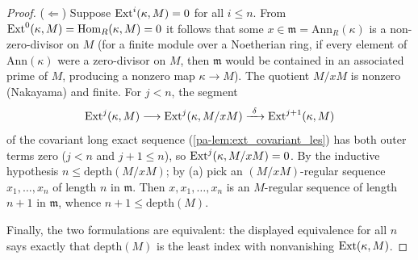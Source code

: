\begin{proof}
  (\(\Leftarrow\)) Suppose \(\operatorname{Ext}^i(\kappa, M) = 0\) for all \(i \leq n\). From
  \(\operatorname{Ext}^0(\kappa, M) = \operatorname{Hom}_R(\kappa, M) = 0\) it follows that some
  \(x \in \mathfrak m = \mathrm{Ann}_R(\kappa)\) is a non-zero-divisor on \(M\) (for a
  finite module over a Noetherian ring, if every element of \(\mathrm{Ann}(\kappa)\)
  were a zero-divisor on \(M\), then \(\mathfrak m\) would be contained in an associated
  prime of \(M\), producing a nonzero map \(\kappa \to M\)). The quotient \(M/xM\) is
  nonzero (Nakayama) and finite. For \(j < n\), the segment
  \[
    \operatorname{Ext}^{j}(\kappa, M) \longrightarrow \operatorname{Ext}^{j}(\kappa, M/xM)
      \xrightarrow{\ \delta\ } \operatorname{Ext}^{j+1}(\kappa, M)
  \]
  of the covariant long exact sequence (\ref{pa-lem:ext_covariant_les}) has both outer
  terms zero (\(j < n\) and \(j + 1 \leq n\)), so \(\operatorname{Ext}^{j}(\kappa, M/xM) = 0\). By the
  inductive hypothesis \(n \leq \mathrm{depth}(M/xM)\); by (a) pick an
  \((M/xM)\)-regular sequence \(x_1, \dots, x_n\) of length \(n\) in \(\mathfrak m\).
  Then \(x, x_1, \dots, x_n\) is an \(M\)-regular sequence of length \(n+1\) in
  \(\mathfrak m\), whence \(n + 1 \leq \mathrm{depth}(M)\).

  Finally, the two formulations are equivalent: the displayed equivalence for all \(n\)
  says exactly that \(\mathrm{depth}(M)\) is the least index with nonvanishing
  \(\operatorname{Ext}(\kappa, M)\).
\end{proof}

